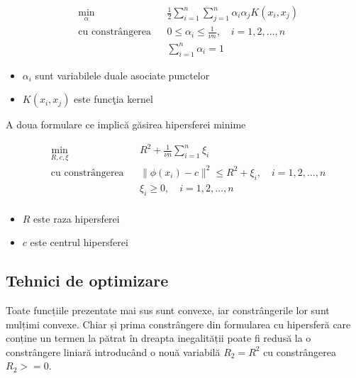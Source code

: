     \begin{equation}
        \begin{aligned}
        & \underset{\alpha}{\text{min}}
        & & \frac{1}{2} \sum_{i=1}^{n} \sum_{j=1}^{n} \alpha_i \alpha_j K(x_i, x_j) \\
        & \text{cu constrângerea}
        & & 0 \leq \alpha_i \leq \frac{1}{\nu n}, \quad i=1,2,\ldots,n \\
        &&& \sum_{i=1}^{n} \alpha_i = 1
        \end{aligned}
        \end{equation}
    
    \begin{itemize}
        \item $\alpha_i$ sunt variabilele duale asociate punctelor 
        \item $K(x_i, x_j)$ este funcţia kernel
    \end{itemize}

A doua formulare ce implică găsirea hipersferei minime

    \begin{equation}
        \begin{aligned}
        & \underset{R, c, \xi}{\text{min}}
        & & R^2 + \frac{1}{\nu n} \sum_{i=1}^{n} \xi_i \\
        & \text{cu constrângerea}
        & & \|\phi(x_i) - c\|^2 \leq R^2 + \xi_i, \quad i=1,2,\ldots,n \\
        &&& \xi_i \geq 0, \quad i=1,2,\ldots,n \\
        \end{aligned}
        \end{equation}
        
        \begin{itemize}
        \item $R$ este raza hipersferei
        \item $c$ este centrul hipersferei
        \end{itemize}
      
        
\subsection{Tehnici de optimizare}

Toate funcțiile prezentate mai sus sunt convexe, iar constrângerile 
lor sunt mulțimi convexe. Chiar
și prima constrângere din formularea cu hipersferă
care conține un termen la pătrat în dreapta 
inegalității poate fi redusă la o constrângere liniară
introducând o nouă variabilă $R_2 = R ^ 2$ cu constrângerea 
$R_2 >= 0$.

